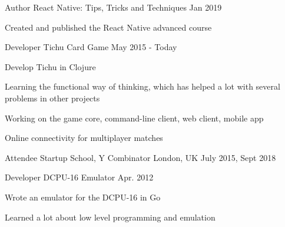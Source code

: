 
\begin{cventries}


  \cventry
    {Author} %
    {React Native: Tips, Tricks and Techniques} %
    {} %
    {Jan 2019} %
    {
      \begin{cvitems} %
        \item {Created and published the React Native advanced course}
      \end{cvitems}
    }
  \cventry
    {Developer} %
    {Tichu Card Game} %
    {} %
    {May 2015 - Today} %
    {
      \begin{cvitems} %
        \item {Develop Tichu in Clojure}
        \item {Learning the functional way of thinking, which has helped a lot with several problems in other projects}
		\item {Working on the game core, command-line client, web client, mobile app}
		\item {Online connectivity for multiplayer matches}
      \end{cvitems}
    }

  \cventry
    {Attendee} %
    {Startup School, Y Combinator} %
    {London, UK} %
    {July 2015, Sept 2018} %
    {}
	
  \cventry
    {Developer} %
    {DCPU-16 Emulator} %
    {} %
    {Apr. 2012} %
    {
      \begin{cvitems} %
        \item {Wrote an emulator for the DCPU-16 in Go}
		\item {Learned a lot about low level programming and emulation}
      \end{cvitems}
    }


\end{cventries}
